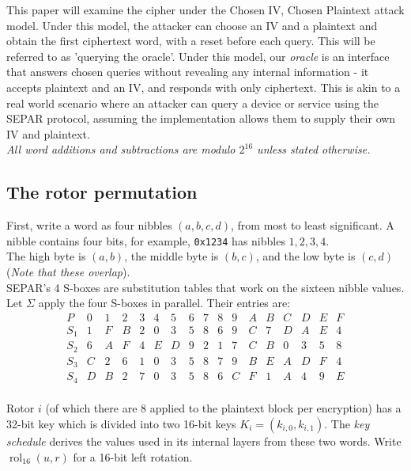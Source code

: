 \documentclass[11pt]{article}
\newcommand{\rol}{\operatorname{rol}_{16}}
\begin{document}
This paper will examine the cipher under the Chosen IV, Chosen Plaintext attack model.
Under this model, the attacker can choose an IV and a plaintext and obtain the first
ciphertext word, with a reset before each query. This will be referred to as 'querying the oracle'. Under this model, our \emph{oracle} is an interface that
answers chosen queries without revealing any internal information - it accepts plaintext and an IV, and responds with only ciphertext. This is akin to a real world scenario where an attacker can query a device or service using the SEPAR protocol, assuming the implementation allows them to supply their own IV and plaintext.\cite{hac}\\

\textit{All word additions and subtractions are modulo \(2^{16}\) unless stated otherwise.}\\

\subsection{The rotor permutation}


First, write a word as four
nibbles \((a,b,c,d)\), from most to least significant. A nibble contains
four bits, for example, \texttt{0x1234} has nibbles \(1,2,3,4\).\\

The high byte is \((a,b)\), the middle byte is \((b,c)\),
and the low byte is \((c,d)\) (\textit{Note that these overlap}).\\

SEPAR's 4 S-boxes are substitution tables that work on the sixteen nibble values.
Let
\(\Sigma\) apply the four S-boxes in parallel. Their entries are:
\[
\begin{array}{c|*{16}{c}}
P&0&1&2&3&4&5&6&7&8&9&A&B&C&D&E&F\\
S_1&1&F&B&2&0&3&5&8&6&9&C&7&D&A&E&4\\
S_2&6&A&F&4&E&D&9&2&1&7&C&B&0&3&5&8\\
S_3&C&2&6&1&0&3&5&8&7&9&B&E&A&D&F&4\\
S_4&D&B&2&7&0&3&5&8&6&C&F&1&A&4&9&E
\end{array}
\]\\

Rotor \(i\) (of which there are 8 applied to the plaintext block per encryption) has a 32-bit key which is divided into two 16-bit keys \(K_i=(k_{i,0},k_{i,1})\).
The \emph{key schedule} derives the values used in its internal
layers from these two words. Write \(\rol(u,r)\) for a 16-bit left rotation.\\
\end{document}
